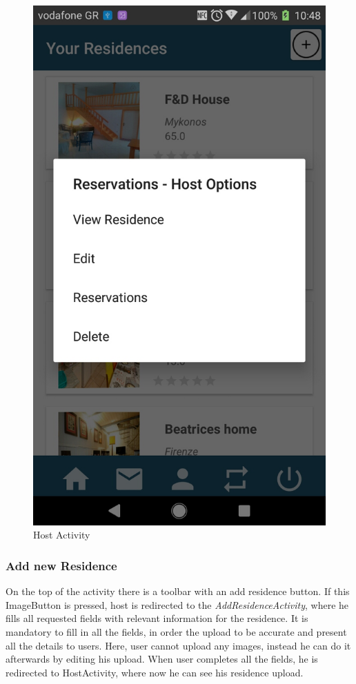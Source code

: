 \documentclass[12pt]{article}
\begin{document}
\begin{figure} [H]
\begin{center}
			\includegraphics [scale = 0.18] {23-host.jpg}
			\caption{Host Activity}
		\end{center}
	\end{figure}
	
	\subsubsection{Add new Residence}
	On the top of the activity there is a toolbar with an add residence button. If this ImageButton is pressed, host is redirected to the \textit{AddResidenceActivity}, where he fills all requested fields with relevant information for the residence. It is mandatory to fill in all the fields, in order the upload to be accurate and present all the details to users. Here, user cannot upload any images, instead he can do it afterwards by editing his upload. When user completes all the fields, he is redirected to HostActivity, where now he can see his residence upload.
	
\end{document}
